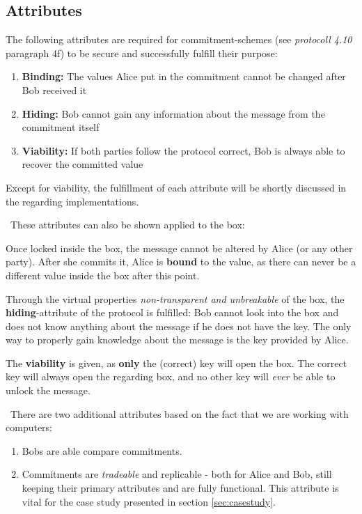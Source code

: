 \subsection{Attributes}
The following attributes are required for commitment-schemes (see \cite{DeHa15} \textit{protocoll 4.10} paragraph 4f) to be secure and successfully fulfill their purpose:

\begin{enumerate}
	\item \textbf{Binding:} The values Alice put in the commitment cannot be changed after Bob received it 
	\item \textbf{Hiding:} Bob cannot gain any information about the message from the commitment itself
	\item \textbf{Viability:} If both parties follow the protocol correct, Bob is always able to recover the committed value
\end{enumerate}
Except for viability, the fulfillment of each attribute will be shortly discussed in the regarding implementations. 

~\newline These attributes can also be shown applied to the box: 

Once locked inside the box, the message cannot be altered by Alice (or any other party). After she commits it, Alice is \textbf{bound} to the value, as there can never be a different value inside the box after this point. 

Through the virtual properties \textit{non-transparent and unbreakable} of the box, the \textbf{hiding}-attribute of the protocol is fulfilled: Bob cannot look into the box and does not know anything about the message if he does not have the key. The only way to properly gain knowledge about the message is the key provided by Alice. 

The \textbf{viability} is given, as \textbf{only} the (correct) key will open the box. The correct key will always open the regarding box, and no other key will \textit{ever} be able to unlock the message. 

~\newline There are two additional attributes based on the fact that we are working with computers:
\begin{enumerate}
	\item Bobs are able compare commitments.
	\item Commitments are \textit{tradeable} and replicable - both for Alice and Bob, still keeping their primary attributes and are fully functional. This attribute is vital for the case study presented in section \ref{sec:casestudy}.
\end{enumerate}

